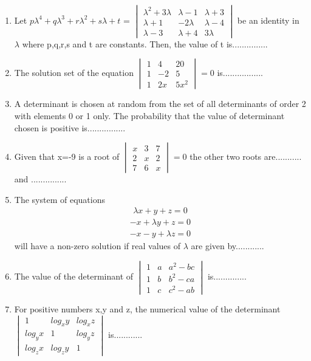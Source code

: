 \begin{enumerate}[label=\arabic*.,ref=\thesubsection.\theenumi]
%
%
%
%
%
%
%
\item Let $p\lambda^4+q\lambda^3+r\lambda^2+s\lambda+t$ =
$\begin{vmatrix} \lambda^2+3\lambda & \lambda-1 & \lambda+3  \\ \lambda+1 & -2\lambda & \lambda-4 \\ \lambda-3 & \lambda+4 & 3\lambda \end{vmatrix}$
be an identity in $\lambda$ where p,q,r,s and t are constants. Then, the value of t is...............
\item The solution set of the equation $\begin{vmatrix} 1 & 4 & 20  \\ 1 & -2 & 5 \\ 1 & 2x & 5x^2 \end{vmatrix}= 0$ is.................
\item A determinant is chosen at random from the set of all determinants of order 2 with elements 0 or 1 only. The probability that the value of determinant chosen is positive is................
\item Given that x=-9 is a root of $\begin{vmatrix} x & 3 & 7  \\ 2 & x & 2 \\ 7 & 6 & x  \end{vmatrix}=0$ the other two roots are........... and ...............
\item The system of equations  
\begin{align} 
\lambda x+y+z=0
\end{align}    
\begin{align}
-x+\lambda y+z=0
\end{align}  
\begin{align}
-x-y+\lambda z=0
\end{align} will have a non-zero solution if real values of 
$\lambda$ are given by............
\item The value of the determinant of 
$\begin{vmatrix} 1 & a & a^2-bc  \\ 1 & b & b^2-ca \\ 1 & c & c^2-ab \end{vmatrix}$ is..............
\item For positive numbers x,y and z, the numerical value of the determinant $\begin{vmatrix} 1 & log_x y & log_x z  \\ log_y x & 1 & log_y z \\ log_z x & log_z y & 1 \end{vmatrix}$ is............

\end{enumerate}
